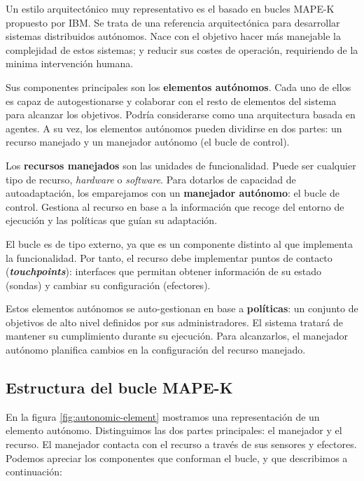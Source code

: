 Un estilo arquitectónico muy representativo es el basado en bucles MAPE-K \cite{ibmcorporationArchitecturalBlueprintAutonomic2006, fonsServiciosAdaptivereadyPara2021} propuesto por IBM. Se trata de una referencia arquitectónica para desarrollar sistemas distribuidos autónomos. Nace con el objetivo hacer más manejable la complejidad de estos sistemas; y reducir sus costes de operación, requiriendo de la minima intervención humana.

Sus componentes principales son los \textbf{elementos autónomos}. Cada uno de ellos es capaz de autogestionarse y colaborar con el resto de elementos del sistema para alcanzar los objetivos. Podría considerarse como una arquitectura basada en agentes. \cite{savaglioAgentbasedInternetThings2020} A su vez, los elementos autónomos pueden dividirse en dos partes: un recurso manejado y un manejador autónomo (el bucle de control).

Los \textbf{recursos manejados} son las unidades de funcionalidad. Puede ser cualquier tipo de recurso, \emph{hardware} o \emph{software}. Para dotarlos de capacidad de autoadaptación, los emparejamos con un \textbf{manejador autónomo}: el bucle de control. Gestiona al recurso en base a la información que recoge del entorno de ejecución y las políticas que guían su adaptación.

El bucle es de tipo externo, ya que es un componente distinto al que implementa la funcionalidad. Por tanto, el recurso debe implementar puntos de contacto (\textbf{\emph{touchpoints}}): interfaces que permitan obtener información de su estado (sondas) y cambiar su configuración (efectores).

Estos elementos autónomos se auto-gestionan en base a \textbf{políticas}: un conjunto de objetivos de alto nivel definidos por sus administradores. El sistema tratará de mantener su cumplimiento durante su ejecución. Para alcanzarlos, el manejador autónomo planifica cambios en la configuración del recurso manejado.

\subsection{Estructura del bucle MAPE-K}
\label{sec:estructura-mape-k}

En la figura \ref{fig:autonomic-element} mostramos una representación de un elemento autónomo. Distinguimos las dos partes principales: el manejador y el recurso. El manejador contacta con el recurso a través de sus sensores y efectores. Podemos apreciar los componentes que conforman el bucle, y que describimos a continuación: \cite{ibmcorporationArchitecturalBlueprintAutonomic2006}

